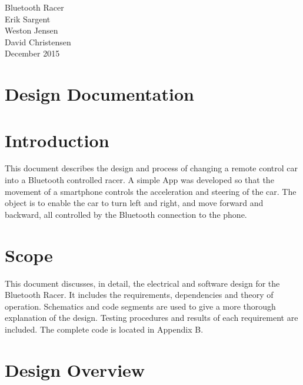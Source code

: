 \documentclass[12pt]{article}
\begin{document}
\begin{titlepage}
\begin {center}
\Huge Bluetooth Racer\\


\Large Erik Sargent\\
\Large Weston Jensen\\
\Large David Christensen\\
December 2015\\
\end {center}

\end{titlepage}


\tableofcontents
\newpage

\section{Design Documentation}

 

\section{Introduction}

This document describes the design and process of changing a remote control car into a Bluetooth controlled racer. A simple App was developed so that the movement of a smartphone controls the acceleration and steering of the car. The object is to enable the car to turn left and right, and move forward and backward, all controlled by the Bluetooth connection to the phone.\\

\section{Scope}
This document discusses, in detail, the electrical and software design for the Bluetooth Racer. It includes the requirements, dependencies and theory of operation. Schematics and code segments are used to give a more thorough explanation of the design. Testing procedures and results of each requirement are included. The complete code is located in Appendix B.\\

\section{Design Overview}
\end{document}

